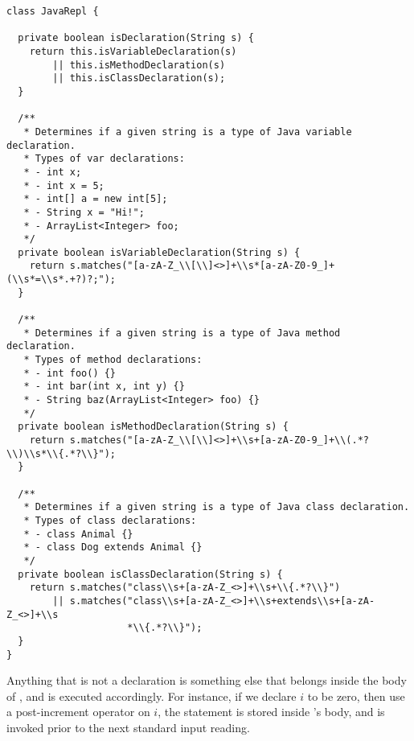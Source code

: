 \begin{lstlisting}[language=MyJava]
class JavaRepl {

  private boolean isDeclaration(String s) {
    return this.isVariableDeclaration(s)
        || this.isMethodDeclaration(s)
        || this.isClassDeclaration(s);
  }

  /**
   * Determines if a given string is a type of Java variable declaration.
   * Types of var declarations:
   * - int x;
   * - int x = 5;
   * - int[] a = new int[5];
   * - String x = "Hi!";
   * - ArrayList<Integer> foo;
   */
  private boolean isVariableDeclaration(String s) {
    return s.matches("[a-zA-Z_\\[\\]<>]+\\s*[a-zA-Z0-9_]+(\\s*=\\s*.+?)?;");
  }

  /**
   * Determines if a given string is a type of Java method declaration.
   * Types of method declarations:
   * - int foo() {}
   * - int bar(int x, int y) {}
   * - String baz(ArrayList<Integer> foo) {}
   */
  private boolean isMethodDeclaration(String s) {
    return s.matches("[a-zA-Z_\\[\\]<>]+\\s+[a-zA-Z0-9_]+\\(.*?\\)\\s*\\{.*?\\}");
  }

  /**
   * Determines if a given string is a type of Java class declaration.
   * Types of class declarations:
   * - class Animal {}
   * - class Dog extends Animal {}
   */
  private boolean isClassDeclaration(String s) {
    return s.matches("class\\s+[a-zA-Z_<>]+\\s+\\{.*?\\}") 
        || s.matches("class\\s+[a-zA-Z_<>]+\\s+extends\\s+[a-zA-Z_<>]+\\s
                     *\\{.*?\\}");
  }
}
\end{lstlisting}

Anything that is not a declaration is something else that belongs inside the body of , and is executed accordingly. For instance, if we declare $i$ to be zero, then use a post-increment operator on $i$, the  statement is stored inside 's  body, and is invoked prior to the next standard input reading. 


